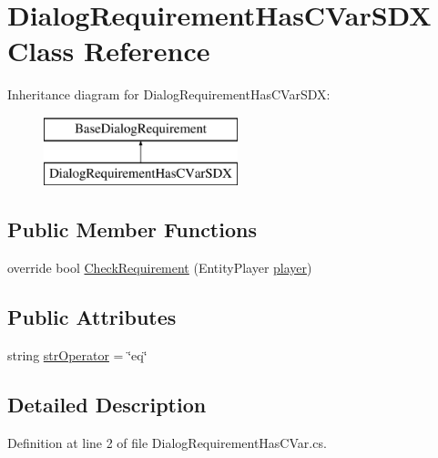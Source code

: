 \hypertarget{class_dialog_requirement_has_c_var_s_d_x}{}\section{Dialog\+Requirement\+Has\+C\+Var\+S\+DX Class Reference}
\label{class_dialog_requirement_has_c_var_s_d_x}
Inheritance diagram for Dialog\+Requirement\+Has\+C\+Var\+S\+DX\+:\begin{figure}[H]
\begin{center}
\leavevmode
\includegraphics[height=2.000000cm]{class_dialog_requirement_has_c_var_s_d_x}
\end{center}
\end{figure}
\subsection*{Public Member Functions}
\begin{DoxyCompactItemize}
\item 
override bool \mbox{\hyperlink{class_dialog_requirement_has_c_var_s_d_x_aeb43ee24f652abc4817d5dbc1b731c1f}{Check\+Requirement}} (Entity\+Player \mbox{\hyperlink{_sphere_i_i_01_music_01_boxes_2_config_2_localization_8txt_a4e2cb8aeff651600ea1cc57fe5a929a4}{player}})
\end{DoxyCompactItemize}
\subsection*{Public Attributes}
\begin{DoxyCompactItemize}
\item 
string \mbox{\hyperlink{class_dialog_requirement_has_c_var_s_d_x_afe5be795d397ed4d4465f226b45f9445}{str\+Operator}} = \char`\"{}eq\char`\"{}
\end{DoxyCompactItemize}


\subsection{Detailed Description}


Definition at line 2 of file Dialog\+Requirement\+Has\+C\+Var.\+cs.



